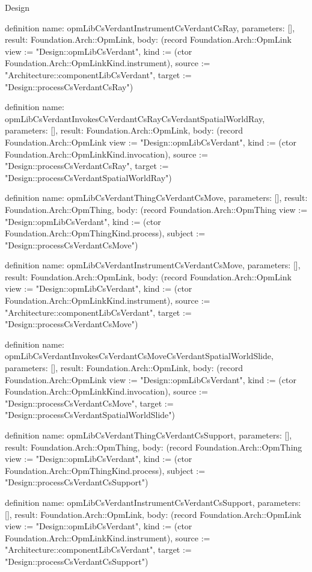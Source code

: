 \begin{lexlean}{Design}
\begin{semanticmodule}
definition{
  name: opmLibCsVerdantInstrumentCsVerdantCsRay,
  parameters: [],
  result: Foundation.Arch::OpmLink,
  body: (record Foundation.Arch::OpmLink {view := "Design::opmLibCsVerdant", kind := (ctor Foundation.Arch::OpmLinkKind.instrument), source := "Architecture::componentLibCsVerdant", target := "Design::processCsVerdantCsRay"})
}

definition{
  name: opmLibCsVerdantInvokesCsVerdantCsRayCsVerdantSpatialWorldRay,
  parameters: [],
  result: Foundation.Arch::OpmLink,
  body: (record Foundation.Arch::OpmLink {view := "Design::opmLibCsVerdant", kind := (ctor Foundation.Arch::OpmLinkKind.invocation), source := "Design::processCsVerdantCsRay", target := "Design::processCsVerdantSpatialWorldRay"})
}

definition{
  name: opmLibCsVerdantThingCsVerdantCsMove,
  parameters: [],
  result: Foundation.Arch::OpmThing,
  body: (record Foundation.Arch::OpmThing {view := "Design::opmLibCsVerdant", kind := (ctor Foundation.Arch::OpmThingKind.process), subject := "Design::processCsVerdantCsMove"})
}

definition{
  name: opmLibCsVerdantInstrumentCsVerdantCsMove,
  parameters: [],
  result: Foundation.Arch::OpmLink,
  body: (record Foundation.Arch::OpmLink {view := "Design::opmLibCsVerdant", kind := (ctor Foundation.Arch::OpmLinkKind.instrument), source := "Architecture::componentLibCsVerdant", target := "Design::processCsVerdantCsMove"})
}

definition{
  name: opmLibCsVerdantInvokesCsVerdantCsMoveCsVerdantSpatialWorldSlide,
  parameters: [],
  result: Foundation.Arch::OpmLink,
  body: (record Foundation.Arch::OpmLink {view := "Design::opmLibCsVerdant", kind := (ctor Foundation.Arch::OpmLinkKind.invocation), source := "Design::processCsVerdantCsMove", target := "Design::processCsVerdantSpatialWorldSlide"})
}

definition{
  name: opmLibCsVerdantThingCsVerdantCsSupport,
  parameters: [],
  result: Foundation.Arch::OpmThing,
  body: (record Foundation.Arch::OpmThing {view := "Design::opmLibCsVerdant", kind := (ctor Foundation.Arch::OpmThingKind.process), subject := "Design::processCsVerdantCsSupport"})
}

definition{
  name: opmLibCsVerdantInstrumentCsVerdantCsSupport,
  parameters: [],
  result: Foundation.Arch::OpmLink,
  body: (record Foundation.Arch::OpmLink {view := "Design::opmLibCsVerdant", kind := (ctor Foundation.Arch::OpmLinkKind.instrument), source := "Architecture::componentLibCsVerdant", target := "Design::processCsVerdantCsSupport"})
}


\end{semanticmodule}
\end{lexlean}
